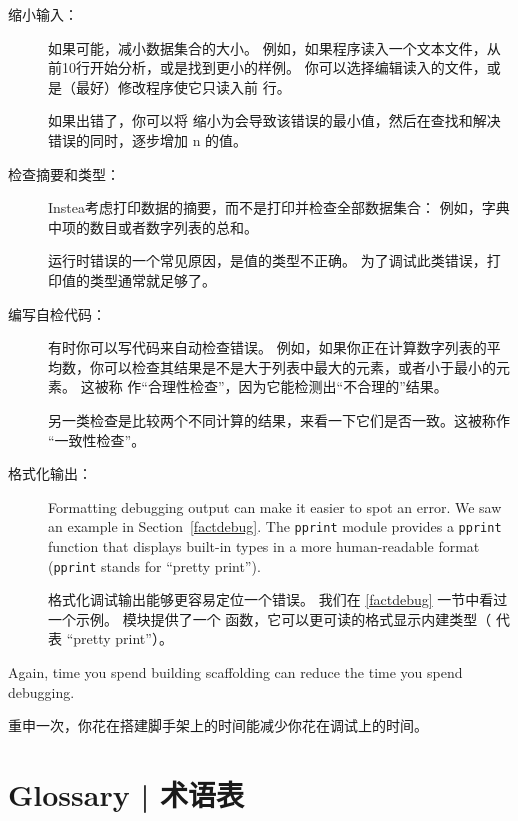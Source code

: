 \begin{description}

\item[缩小输入：] 如果可能，减小数据集合的大小。
    例如，如果程序读入一个文本文件，从前10行开始分析，或是找到更小的样例。
    你可以选择编辑读入的文件，或是（最好）修改程序使它只读入前  行。

    如果出错了，你可以将  缩小为会导致该错误的最小值，然后在查找和解决错误的同时，逐步增加 n 的值。

\item[检查摘要和类型：] Instea考虑打印数据的摘要，而不是打印并检查全部数据集合：
    例如，字典中项的数目或者数字列表的总和。

    运行时错误的一个常见原因，是值的类型不正确。 为了调试此类错误，打印值的类型通常就足够了。

\item[编写自检代码：]  有时你可以写代码来自动检查错误。 例如，如果你正在计算数字列表的平均数，你可以检查其结果是不是大于列表中最大的元素，或者小于最小的元素。 这被称 作``合理性检查''，因为它能检测出``不合理的''结果。

  

另一类检查是比较两个不同计算的结果，来看一下它们是否一致。这被称作 ``一致性检查''。

\item[格式化输出：] Formatting debugging output
can make it easier to spot an error.  We saw an example in
Section~\ref{factdebug}.  The {\tt pprint} module provides
a {\tt pprint} function that displays built-in types in
a more human-readable format ({\tt pprint} stands for
``pretty print'').

格式化调试输出能够更容易定位一个错误。 我们在 \ref{factdebug} 一节中看过一个示例。  模块提供了一个  函数，它可以更可读的格式显示内建类型（  代表 ``pretty print''）。

  

\end{description}

Again, time you spend building scaffolding can reduce
the time you spend debugging.

重申一次，你花在搭建脚手架上的时间能减少你花在调试上的时间。



\section{Glossary  |  术语表}

